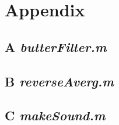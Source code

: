 \section{Appendix}

\subsection{A \emph{butterFilter.m}}


\subsection{B \emph{reverseAverg.m}}


\subsection{C \emph{makeSound.m}}

%
